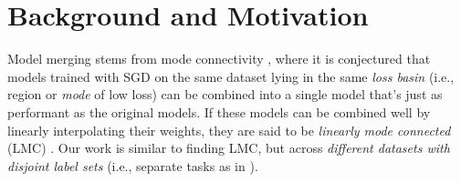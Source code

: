 % 

\section{Background and Motivation} \label{sec:motivation}

Model merging stems from mode connectivity \cite{garipov2018loss}, where it is conjectured that models trained with SGD on the same dataset lying in the same \textit{loss basin} (i.e., region or \textit{mode} of low loss) can be combined into a single model that's just as performant as the original models. If these models can be combined well by linearly interpolating their weights, they are said to be \textit{linearly mode connected} (LMC) \cite{garipov2018loss,entezari2021role}. Our work is similar to finding LMC, but across \textit{different datasets with disjoint label sets} (i.e., separate tasks as in \citet{de2021continual}).


